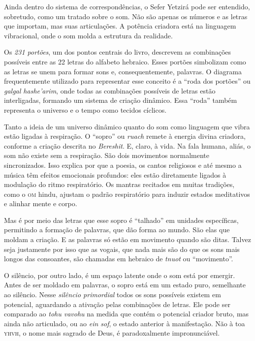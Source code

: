 {Ainda dentro do sistema de correspondências, o Sefer Yetzirá pode ser entendido, sobretudo, como um tratado sobre o som. Não são apenas os números e as letras que importam, mas suas articulações. A potência criadora está na linguagem vibracional, onde o som molda a estrutura da realidade.

Os \textit{231 portões}, um dos pontos centrais do livro, descrevem as combinações possíveis entre as 22 letras do alfabeto hebraico. Esses portões simbolizam como as letras se unem para formar sons e, consequentemente, palavras. O diagrama frequentemente utilizado para representar esse conceito é a ``roda dos portões'' ou \textit{galgal hashe'arim}, onde todas as combinações possíveis de letras estão interligadas, formando um sistema de criação dinâmico. Essa ``roda'' também representa o universo e o tempo como tecidos cíclicos.


Tanto a ideia de um universo dinâmico quanto do som como linguagem que vibra estão ligadas à respiração. O ``sopro'' ou \textit{ruach} remete à energia divina criadora, conforme a criação descrita no \textit{Bereshit}. E, claro, à vida. Na fala humana, aliás, o som não existe sem a respiração. São dois movimentos normalmente sincronizados. Isso explica por que a poesia, os cantos religiosos e até mesmo a música têm efeitos emocionais profundos: eles estão diretamente ligados à modulação do ritmo respiratório. Os mantras recitados em muitas tradições, como o \textsc{om} hindu, ajustam o padrão respiratório para induzir estados meditativos e alinhar mente e corpo.

Mas é por meio das letras que esse sopro é ``talhado'' em unidades específicas, permitindo a formação de palavras, que dão forma ao mundo. São elas que moldam a criação. E as palavras só estão em movimento quando são ditas. Talvez seja justamente por isso que as vogais, que nada mais são do que os sons mais longos das consoantes, são chamadas em hebraico de \textit{tnuot} ou ``movimento''.


O silêncio, por outro lado, é um espaço latente onde o som está por emergir. Antes de ser moldado em palavras, o sopro está em um estado puro, semelhante ao silêncio. Nesse \textit{silêncio primordial} todos os sons possíveis existem em potencial, aguardando a ativação pelas combinações de letras. Ele pode ser comparado ao \textit{tohu vavohu} na medida que contém o potencial criador bruto, mas ainda não articulado, ou ao \textit{ein sof}, o estado anterior à manifestação. Não à toa \textsc{yhvh}, o nome mais sagrado de Deus, é paradoxalmente impronunciável.

}
